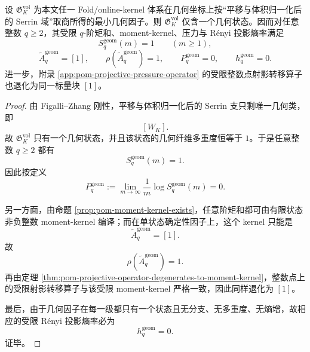 \begin{theorem}\label{thm:conclusion-serrin-geometry-factor-renyi-moment-trivialization}
设 \(\mathfrak G_K^{\mathrm{vol}}\) 为本文任一 Fold/online-kernel 体系在几何坐标上按“平移与体积归一化后的 Serrin 域”取商所得的最小几何因子。则 \(\mathfrak G_K^{\mathrm{vol}}\) 仅含一个几何状态。因而对任意整数 \(q\ge 2\)，其受限 \(q\)-阶矩和、moment-kernel、压力与 Rényi 投影熵率满足
\[
S_q^{\mathrm{geom}}(m)=1\qquad (m\ge 1),
\]
\[
\widetilde A_q^{\mathrm{geom}}=[1],
\qquad
\rho(\widetilde A_q^{\mathrm{geom}})=1,
\qquad
P_q^{\mathrm{geom}}=0,
\qquad
h_q^{\mathrm{geom}}=0.
\]
进一步，附录 \ref{app:pom-projective-pressure-operator} 的受限整数点射影转移算子也退化为同一标量块 \([1]\)。
\end{theorem}
\begin{proof}
由 Figalli--Zhang 刚性，平移与体积归一化后的 Serrin 支只剩唯一几何类，即
\[
[W_K].
\]
故 \(\mathfrak G_K^{\mathrm{vol}}\) 只有一个几何状态，并且该状态的几何纤维多重度恒等于 \(1\)。于是任意整数 \(q\ge 2\) 都有
\[
S_q^{\mathrm{geom}}(m)=1.
\]
因此按定义
\[
P_q^{\mathrm{geom}}
:=
\lim_{m\to\infty}\frac1m\log S_q^{\mathrm{geom}}(m)=0.
\]

另一方面，由命题 \ref{prop:pom-moment-kernel-exists}，任意阶矩和都可由有限状态非负整数 moment-kernel 编译；而在单状态确定性因子上，这个 kernel 只能是
\[
\widetilde A_q^{\mathrm{geom}}=[1].
\]
故
\[
\rho(\widetilde A_q^{\mathrm{geom}})=1.
\]
再由定理 \ref{thm:pom-projective-operator-degenerates-to-moment-kernel}，整数点上的受限射影转移算子与该受限 moment-kernel 严格一致，因此同样退化为 \([1]\)。

最后，由于几何因子在每一级都只有一个状态且无分支、无多重度、无熵增，故相应的受限 Rényi 投影熵率必为
\[
h_q^{\mathrm{geom}}=0.
\]
证毕。
\end{proof}

